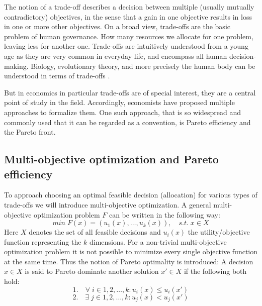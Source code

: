 

	The notion of a trade-off describes a decision between multiple (usually mutually contradictory) objectives, in the sense that a gain in one objective results in loss in one or more other objectives.
	On a broad view, trade-offs are the basic problem of human governance.
    How many resources we allocate for one problem, leaving less for another one.
	Trade-offs are intuitively understood from a young age as they are very common in everyday life, and encompass all human decision-making.
	Biology, evolutionary theory, and more precisely the human body can be understood in terms of trade-offs \cite{Launer2020}.

	But in economics in particular trade-offs are of special interest, they are a central point of study in the field.
	Accordingly, economists have proposed multiple approaches to formalize them.
	One such approach, that is so widespread and commonly used that it can be regarded as a convention, is Pareto efficiency and the Pareto front.

	\subsection{Multi-objective optimization and Pareto efficiency}

	To approach choosing an optimal feasible decision (allocation) for various types of trade-offs we will introduce multi-objective optimization.
	A general multi-objective optimization problem $F$ can be written in the following way:
	$$min \; F(x)=(u_1(x),\dots,u_k(x)), \quad s.t.\; x\in X$$
	Here $X$ denotes the set of all feasible decisions and $u_i(x)$ the utility/objective function representing the $k$ dimensions.
	For a non-trivial multi-objective optimization problem it is not possible to minimize every single objective function at the same time.
	Thus the notion of Pareto optimality is introduced:
	A decision $x\in X$ is said to Pareto dominate another solution $x'\in X$ if the following both hold:
	$$1.\quad \forall\; i\in {1,2,\dots,k}: u_i(x)\le u_i(x')$$
	$$2.\quad \exists\; j\in {1,2,\dots,k}: u_j(x) < u_j(x')$$

